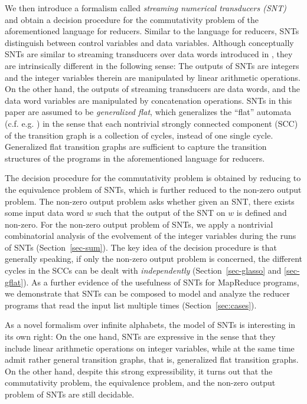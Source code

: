 We then introduce a formalism called \emph{streaming numerical transducers (SNT)} and obtain a decision procedure for the commutativity problem of the aforementioned language for reducers.
Similar to the language for reducers, SNTs distinguish between control variables and data variables. Although conceptually SNTs are similar to streaming transducers over data words introduced in \cite{RP11}, they are intrinsically different in the following sense: The outputs of SNTs are integers and the integer variables therein are manipulated by linear arithmetic operations. On the other hand, the outputs of streaming transducers are data words, and the data word variables are manipulated by concatenation operations. SNTs in this paper are assumed to be \emph{generalized flat}, which generalizes the ``flat'' automata (c.f. e.g. \cite{LS06}) in the sense that each nontrivial strongly connected component (SCC) of the transition graph is a collection of cycles, instead of one single cycle. Generalized flat transition graphs are sufficient to capture the transition structures of the programs in the aforementioned language for reducers.

The decision procedure for the commutativity problem is obtained by reducing to the equivalence problem of SNTs, which is further reduced to the non-zero output problem. The non-zero output problem asks whether given an SNT, there exists some input data word $w$ such that the output of the SNT on $w$ is defined and non-zero.  For the non-zero output problem of SNTs, we apply a nontrivial combinatorial analysis of the evolvement of the integer variables during the runs of SNTs (Section~\ref{sec-sum}). The key idea of the decision procedure is that generally speaking, if only the non-zero output problem is concerned, the different cycles in the SCCs can be dealt with \emph{independently} (Section~\ref{sec-glasso} and \ref{sec-gflat}). 
%
As a further evidence of the usefulness of SNTs for MapReduce programs, we demonstrate that SNTs can be composed to model and analyze the reducer programs that read the input list multiple times (Section~\ref{sec:cases}). 

As a novel formalism over infinite alphabets, the model of SNTs is interesting in its own right: On the one hand, SNTs are expressive in the sense that they include linear arithmetic operations on integer variables, while at the same time admit rather general transition graphs, that is, generalized flat transition graphs. On the other hand, despite this strong expressibility, it turns out that the commutativity problem, the equivalence problem, and the non-zero output problem of SNTs are still decidable.  


